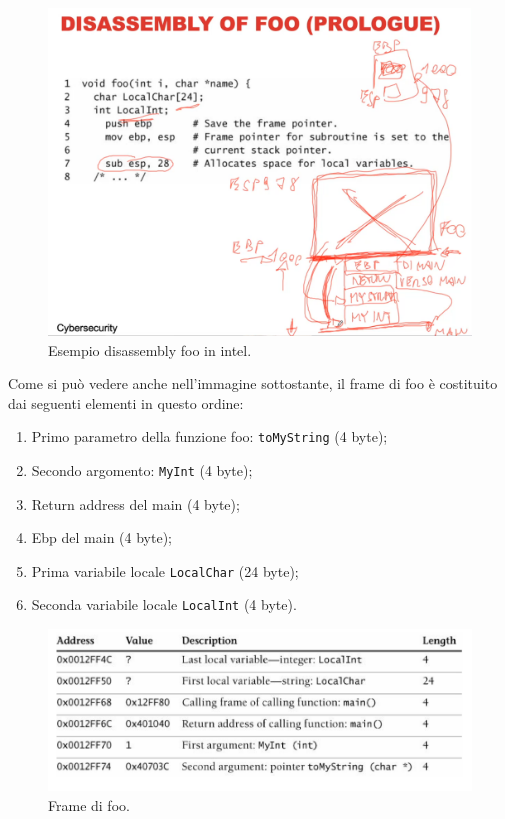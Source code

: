 \begin{figure}[H]
    \centering
    \includegraphics[width=13cm, keepaspectratio]{capitoli/secure_coding/img/cap_2/disass_intel_2.png}
    \caption{Esempio disassembly foo in intel.}\label{fig:disass_intel_2}
\end{figure}

Come si può vedere anche nell'immagine sottostante, il frame di foo è costituito dai
seguenti elementi in questo ordine:

\begin{enumerate}
    \item Primo parametro della funzione foo: \verb|toMyString| (4 byte);
    \item Secondo argomento: \verb|MyInt| (4 byte);
    \item Return address del main (4 byte);
    \item Ebp del main (4 byte);
    \item Prima variabile locale \verb|LocalChar| (24 byte);
    \item Seconda variabile locale \verb|LocalInt|  (4 byte).
\end{enumerate}

\begin{figure}[H]
    \centering
    \includegraphics[width=13cm, keepaspectratio]{capitoli/secure_coding/img/cap_2/diss_stack.png}
    \caption{Frame di foo.}\label{fig:frame_foo}
\end{figure}

